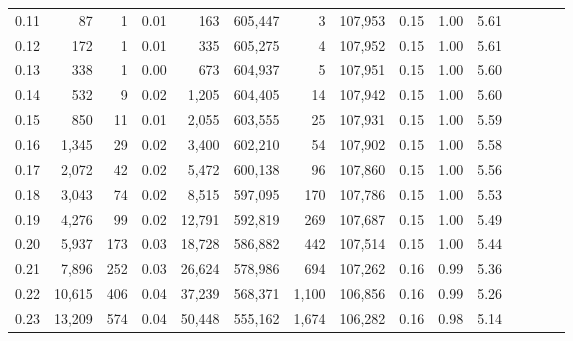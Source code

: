 \begin{tabular}{rrrcrrrrrrrrrrr}
0.11 &      87 &      1 &                                       0.01 &      163 &  605,447 &        3 &  107,953 &  0.15 &  1.00 &                         5.61 \\
0.12 &     172 &      1 &                                       0.01 &      335 &  605,275 &        4 &  107,952 &  0.15 &  1.00 &                         5.61 \\
0.13 &     338 &      1 &                                       0.00 &      673 &  604,937 &        5 &  107,951 &  0.15 &  1.00 &                         5.60 \\
0.14 &     532 &      9 &                                       0.02 &    1,205 &  604,405 &       14 &  107,942 &  0.15 &  1.00 &                         5.60 \\
0.15 &     850 &     11 &                                       0.01 &    2,055 &  603,555 &       25 &  107,931 &  0.15 &  1.00 &                         5.59 \\
0.16 &   1,345 &     29 &                                       0.02 &    3,400 &  602,210 &       54 &  107,902 &  0.15 &  1.00 &                         5.58 \\
0.17 &   2,072 &     42 &                                       0.02 &    5,472 &  600,138 &       96 &  107,860 &  0.15 &  1.00 &                         5.56 \\
0.18 &   3,043 &     74 &                                       0.02 &    8,515 &  597,095 &      170 &  107,786 &  0.15 &  1.00 &                         5.53 \\
0.19 &   4,276 &     99 &                                       0.02 &   12,791 &  592,819 &      269 &  107,687 &  0.15 &  1.00 &                         5.49 \\
0.20 &   5,937 &    173 &                                       0.03 &   18,728 &  586,882 &      442 &  107,514 &  0.15 &  1.00 &                         5.44 \\
0.21 &   7,896 &    252 &                                       0.03 &   26,624 &  578,986 &      694 &  107,262 &  0.16 &  0.99 &                         5.36 \\
0.22 &  10,615 &    406 &                                       0.04 &   37,239 &  568,371 &    1,100 &  106,856 &  0.16 &  0.99 &                         5.26 \\
0.23 &  13,209 &    574 &                                       0.04 &   50,448 &  555,162 &    1,674 &  106,282 &  0.16 &  0.98 &                         5.14 \\

\end{tabular}
